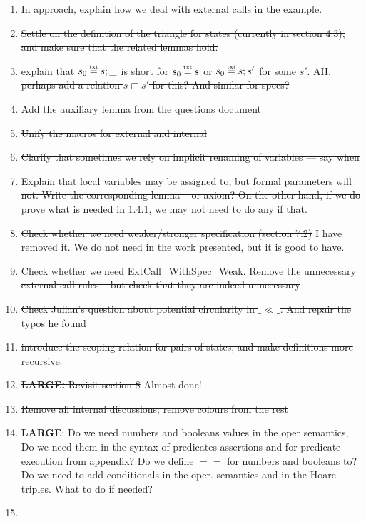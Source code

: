 \documentclass[acmsmall,review,anonymous]{acmart}\settopmatter{printfolios=true}
\begin{document}
\begin{enumerate}
\item
\st{In approach, explain how we deal with external calls in the  example.}
\item
\st{Settle on the definition of  the triangle for states (currently in section 4.3), and make sure that the related lemmas hold.}
\item
\st{explain that $s_0\txteq s;\_$ is short for $s_0\txteq s$  or  $s_0\txteq s;s'$ for some $s'$. AH. perhaps add a relation $s \sqsubset s'$ for this? And similar for specs?}
\item
Add the auxiliary lemma from the questions document
\item
\st{Unify the macros for external and internal}

\item
\st{Clarify that sometimes we rely on implicit renaming of variables — say when}

\item
\st{Explain that local variables may be assigned to, but formal parameters will not. Write the corresponding lemma -- or axiom?
On the other hand, if we do prove what is needed in 1.4.1, we may not need to do any if that.}

\item
\st{Check whether we need weaker/stronger specification (section 7.2)} I have removed it. We do not need in the work presented, but it is good to have.

\item
\st{Check whether we need ExtCall\_WithSpec\_Weak. Remove the unnecessary external call rules -- but check that they are indeed unnecessary}

\item
\st{Check Julian's question about potential circularity in $\_\ll\_$. And repair the typos he found}
\item
\st{introduce the scoping relation for pairs of states, and make definitions more recursive.}

\item
\st{\textbf{LARGE:} Revisit section 8} Almost done!

\item
\st{Remove all internal discussions; remove colours from the rest}

\item

\textbf{LARGE}: Do we need numbers and booleans values in the oper semantics, 
Do we need them in the syntax of predicates assertions and for predicate execution from appendix?
Do we define $==$ for numbers and booleans to?  
Do we need to add conditionals in the oper. semantics and in the Hoare triples. What to do if needed?
\item


\end{enumerate}
\end{document}
